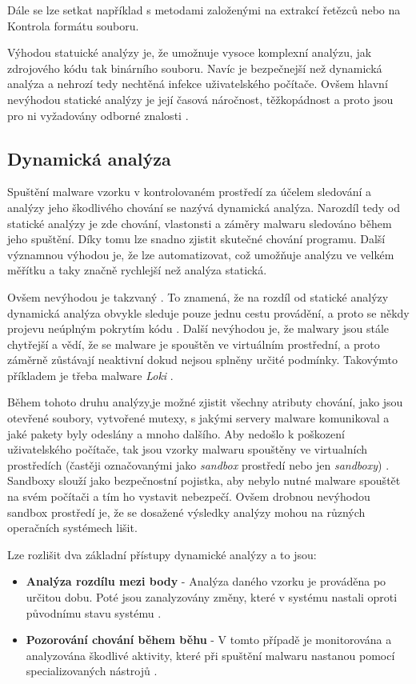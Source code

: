 Dále se lze setkat například s metodami založenými na extrakcí řetězců nebo na Kontrola formátu souboru.

Výhodou statuické analýzy je, že umožnuje vysoce komplexní analýzu, jak zdrojového kódu tak binárního souboru. Navíc je bezpečnejší než dynamická analýza a nehrozí tedy nechtěná infekce uživatelského počítače.
Ovšem hlavní nevýhodou statické analýzy je její časová náročnost, těžkopádnost a proto jsou pro ni vyžadovány odborné znalosti \cite{article_analysis_goat}.

\newpage
\subsection*{Dynamická analýza} \label{dynamic}
Spuštění malware vzorku v kontrolovaném prostředí za účelem sledování a analýzy jeho škodlivého chování se nazývá dynamická analýza.
Narozdíl tedy od statické analýzy je zde chování, vlastonsti a záměry malwaru sledováno během jeho spuštění.
Díky tomu lze snadno zjistit skutečné chování programu. Další významnou výhodou je, že lze automatizovat, což umožňuje analýzu ve velkém měřítku a taky značně rychlejší než analýza statická.

Ovšem nevýhodou je takzvaný . To znamená, že na rozdíl od statické analýzy dynamická analýza obvykle sleduje pouze jednu cestu provádění, a proto se někdy projevu
neúplným pokrytím kódu \cite{article_analysis_goat}. Další nevýhodou je, že malwary jsou stále chytřejší a vědí, že se malware je spouštěn ve virtuálním prostřední, a proto záměrně zůstávají neaktivní dokud nejsou splněny určité podmínky. Takovýmto příkladem je třeba malware \textit{Loki} \cite{malware_analysis}.

Během tohoto druhu analýzy,je možné zjistit všechny atributy chování, jako jsou otevřené soubory, vytvořené mutexy, s jakými servery malware komunikoval a jaké pakety byly odeslány a mnoho dalšího.
Aby nedošlo k poškození uživatelského počítače, tak jsou vzorky malwaru spouštěny ve virtualních prostředích (častěji označovanými jako \textit{sandbox} prostředí nebo jen \textit{sandboxy}) \cite{malware_analysis}. Sandboxy slouží jako bezpečnostní pojistka, aby
nebylo nutné malware spouštět na svém počítači a tím ho vystavit nebezpečí. Ovšem drobnou nevýhodou sandbox prostředí je, že se dosažené výsledky analýzy mohou na různých operačních systémech lišit.

Lze rozlišit dva základní přístupy dynamické analýzy a to jsou:
\begin{itemize}
    \item \textbf{Analýza rozdílu mezi body} - Analýza daného vzorku je prováděna po určitou dobu. Poté jsou zanalyzovány změny, které v systému nastali oproti původnímu stavu systému \cite{article_analysis_goat}.
    \item \textbf{Pozorování chování během běhu} - V tomto případě je monitorována a analyzována škodlivé aktivity, které při spuštění malwaru nastanou pomocí specializovaných nástrojů \cite{article_analysis_goat}. 
\end{itemize}

